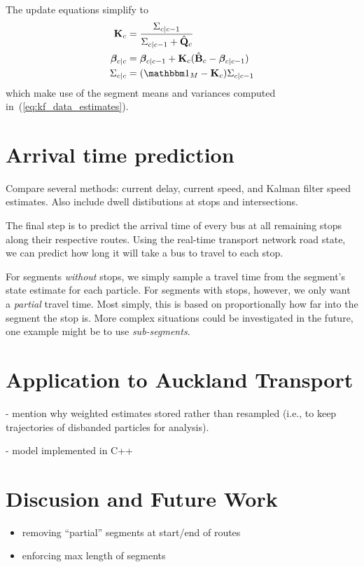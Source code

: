 \documentclass[draftcls,a4paper,onecolumn]{IEEEtran}\usepackage[]{graphicx}\usepackage[]{color}
\begin{document}
The update equations simplify to
\begin{align}
  \bK_c &= \frac{\Sigma_{c|c-1}}{\Sigma_{c|c-1} + \hat {\mat Q}_c} \\
  \bbeta_{c|c} &= \bbeta_{c|c-1} + \bK_c(\hat {\mat B}_c - \bbeta_{c|c-1}) \\
  \Sigma_{c|c} &= (\eye_M - \bK_c) \Sigma_{c|c-1}
\end{align}
which make use of the segment means and variances computed in~(\ref{eq:kf_data_estimates}).


\section{Arrival time prediction}
\label{sec:arrival_time}


Compare several methods:
current delay, current speed, and Kalman filter speed estimates.
Also include dwell distibutions at stops and intersections.


The final step is to predict the arrival time of every bus 
at all remaining stops along their respective routes.
Using the real-time transport network road state, 
we can predict how long it will take a bus to travel 
to each stop.


For segments \emph{without} stops,
we simply sample a travel time from the segment's state estimate
for each particle.
For segments with stops, however,
we only want a \emph{partial} travel time.
Most simply, this is based on proportionally how far into the segment
the stop is.
More complex situations could be investigated in the future,
one example might be to use \emph{sub-segments}.



\section{Application to Auckland Transport}
\label{sec:results}

- mention why weighted estimates stored rather than resampled 
(i.e., to keep trajectories of disbanded particles for analysis).

- model implemented in C++


\section{Discusion and Future Work}
\label{sec:discussion}

\begin{itemize}
\item removing ``partial'' segments at start/end of routes
\item enforcing max length of segments
\end{itemize}
\end{document}
